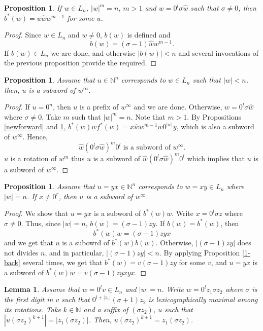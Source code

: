 \documentclass{article}
\newtheorem{proposition}[theorem]{Proposition}
\newtheorem{lemma}[theorem]{Lemma}
\theoremstyle{definition}
\newcommand{\N}{{\mathbb{N}}}
\begin{document}
\begin{proposition}
	\label{*-back}
	If $w\in L_n$, $|w|^m=n$, $m>1$ and $w= 0^l\sigma\hat{w}$ such that $\sigma\neq 0$, then $b^*(w)=u\hat{w}w^{m-1}$ for some $u$.
\end{proposition}

\begin{proof}
	Since $w\in L_n$ and $w\neq 0$, $b(w)$ is defined and 
	$$b(w)=(\sigma-1)\hat{w}w^{m-1}.$$
	If $b(w)\in L_n$ we are done, and otherwise $|b(w)|<n$ and several invocations of the previous proposition provide the required.
\end{proof}


\begin{proposition}
	Assume that $u\in \mathbb{N}^n$ corresponds to $w\in L_n$ such that $|w|<n$. then, $u$ is a subword of $w^\infty$. 
\end{proposition}

\begin{proof}
	If $u=0^n$, then $u$ is a prefix of $w^\infty$ and we are done. Otherwise, $w=0^l\sigma\hat{w}$ where $\sigma\neq 0$. Take $m$ such that $|w|^m=n$. Note that $m>1$. By Propositions \ref{newforward} and  \ref{*-back}, $b^*(w)wf^*(w)=x\hat{w}w^{m-1}w0^{|w|}y$, which is also a subword of $w^\infty$. Hence, 
	$$\hat{w}(0^l\sigma\hat{w})^m0^l \text{ is a subword of } w^\infty.$$
	$u$ is a rotation of $w^m$ thus $u$ is a subword of $\hat{w}(0^l\sigma\hat{w})^m0^l$ which implies that $u$ is a subword of $w^\infty$.
\end{proof}


\begin{proposition}
	Assume that $u=yx\in\mathbb{N}^n$ corresponds to $w=xy\in L_n$ where $|w|=n$. If $x\neq 0^r$, then $u$ is a subword of $w^\infty$. 
\end{proposition}

\begin{proof}
	We show that $u=yx$ is a subword of $b^*(w)w$. Write $x=0^l\sigma z$ where $\sigma\neq 0$. Thus, since $|w|=n$, $b(w)=(\sigma-1)zy$. If $b(w)=b^*(w)$, then 
	$$b^*(w)w=(\sigma-1)zyx$$
	and we get that $u$ is a subowrd of $b^*(w)b(w)$. Otherwise, $|(\sigma-1)zy|$ does not divides $n$, and in particular, $|(\sigma-1)zy|<n$. By applying Proposition \ref{1-back} several times, we get that $b^*(w)=v(\sigma-1)zy$ for some $v$, and $u=yx$ is a subword of $b^*(w)w=v(\sigma-1)zyxyx$.
\end{proof}

\begin{lemma}
	\label{z1}
	Assume that $w=0^lv\in L_n$ and $|w|=n$. Write $w=0^lz_1\sigma z_2$ where $\sigma$ is the first digit in $v$ such that $0^{l+|z_1|}(\sigma+1)z_2$ is lexicographically maximal among its rotations. Take $k\in \N$ and a suffix of $(\sigma z_2)$, $u$ such that $|u(\sigma z_2)^{k+1}|=|z_1(\sigma z_2)|$. Then, $u(\sigma z_2)^{k+1}= z_1(\sigma z_2)$.
\end{lemma}
\end{document}
